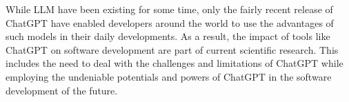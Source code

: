 While \ac{LLM} have been existing for some time, only the fairly recent release of ChatGPT have enabled developers around the world to use the advantages of such models in their daily developments. As a result, the impact of tools like ChatGPT on software development are part of current scientific research. This includes the need to deal with the challenges and limitations of ChatGPT while employing the undeniable potentials and powers of ChatGPT in the software development of the future. 
\begin{comment}
Ziel dieser Bachelorarbeit war es, ein Tool zu Bewertung der Dokumentation zu entwickeln, das in einem \ac{CI/CD}-Prozess eingebunden werden kann und nicht auf einer Programmiersprache beschränkt ist. Dabei beschränkt sich diese Bachelorarbeit auf strukturierte Kommentaren wie z.~B. Javadoc. Dieses Ziel wurde im Großen und Ganzen erreicht.

Durch die allgemein gehaltene Klassenstruktur für das Parsing ist es möglich, Quellcode in anderen Programmiersprachen bewerten zu lassen. Allerdings muss dafür ein entsprechender Parser geschrieben werden, welcher den Quellcode in die vorgegebene Struktur transformiert. Dabei ist es natürlich nicht möglich, jedes Detail abzubilden, sondern es müssen Abstriche gemacht werden. Nichtsdestotrotz können auch sprachspezifische Eigenheiten berücksichtigt werden, indem eine entsprechende abgeleitete Klasse von \textit{ComponentMetaInformation} gebildet wird und diese sprachspezifischen Informationen dort gespeichert werden. Diese Daten können von einem geeigneten \textit{LanguageSpecificHelper} dazu verwendet werden, um sprachabhängige Details bei der Bewertung der Dokumentation zu berücksichtigen. 

Auch das Parsen der strukturierten Kommentare erfolgt recht abstrakt, indem  die Informationen in den Beschreibungstexten unstrukturiert als Zeichenketten gespeichert werden, sodass die einzelnen Metriken diese Informationen weiterverarbeiten müssen. Da es Metriken gibt, die mit den einzelnen Wörtern ein eines Kommentars arbeiten und auch Metriken, welche die interne Struktur des Kommentars analysieren, wäre es ein mögliches Forschungsthema, wie diese zwei Darstellungen besser repräsentiert werden können. 

Um das Tool konfigurierbar zu halten, wurde ein Konzept für eine Konfigurationsdatei im \ac{JSON}-Format vorgestellt, das alle wichtigen Informationen enthält. Die Konfiguration kann auch über GitHub Actions durchgeführt werden, indem passende Umgebungsvariablen gesetzt werden.  So kann das Tool sowohl als reguläres Programm auf einem lokalen System verwendet werden als auch mittels GitHub Actions in den \ac{CI/CD}-Prozess eingebunden werden. Durch die flexible Konfiguration kann ein Nutzer frei entscheiden, welche Metriken er für sinnvoll hält und wie er sie gewichten will. Dabei überschreibt die Konfiguration mittels GitHub Actions stets die Konfiguration in der \ac{JSON}-Datei. Außerdem können die Metriken selbst begrenzt konfiguriert werden. Eine Nutzung des Tools auf anderen \ac{CI/CD}-Plattformen, die mit GitHub Actions vergleichbar sind,  ist prinzipiell ebenfalls möglich, da die Konfiguration von dem  übrigen Programm entkoppelt ist.


\end{comment}
